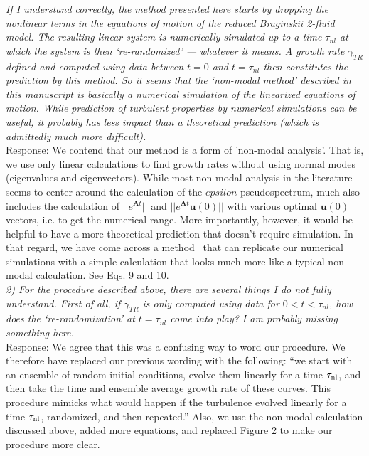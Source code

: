 \documentclass[12pt]{article}
\begin{document}
\emph{If I understand correctly, the method presented here starts by dropping the nonlinear terms in
the equations of motion of the reduced Braginskii 2-fluid model. The resulting linear system is
numerically simulated up to a time $\tau_{nl}$ at which the system is then ‘re-randomized’ — whatever
it means. A growth rate $\gamma_{TR}$ defined and computed using data between $t = 0$ and $t = \tau_{nl}$ then
constitutes the prediction by this method. So it seems that the ‘non-modal method’ described in
this manuscript is basically a numerical simulation of the linearized equations of motion. While
prediction of turbulent properties by numerical simulations can be useful, it probably has less
impact than a theoretical prediction (which is admittedly much more difficult).} \\

Response: We contend that our method is a form of 'non-modal analysis'. That is, we use only linear calculations to find growth rates without using normal modes (eigenvalues and eigenvectors). While most non-modal analysis in the literature seems to center around the calculation of the $epsilon$-pseudospectrum, much also includes the calculation of $||e^{\mathbf{A} t}||$ and $||e^{\mathbf{A} t} \mathbf{u}(0)||$ with various optimal $\mathbf{u}(0)$ vectors, i.e. to get the numerical range. More importantly, however, it would be helpful to have a more theoretical prediction that doesn't require simulation. In that regard, we have come across a method~\cite{camargo1998} that can replicate our numerical simulations with a simple calculation that looks much more like a typical non-modal calculation. See Eqs. 9 and 10. \\

\emph{2) For the procedure described above, there are several things I do not fully understand. First of
all, if $\gamma_{TR}$ is only computed using data for $0 < t < \tau_{nl}$, how does the ‘re-randomization’ at $t = \tau_{nl}$
come into play? I am probably missing something here.} \\


Response: We agree that this was a confusing way to word our procedure. We therefore have replaced our previous wording with the following: ``we start with an ensemble of random initial conditions, evolve them linearly for a time $\tau_{\rm{nl}}$, and then take the time and ensemble average growth rate of these curves. 
This procedure mimicks what would happen if the turbulence evolved linearly for a time $\tau_{\rm{nl}}$, randomized, and then repeated.'' Also, we use the non-modal calculation discussed above, added more equations, and replaced Figure 2 to make our procedure more clear.
\\
\end{document}
